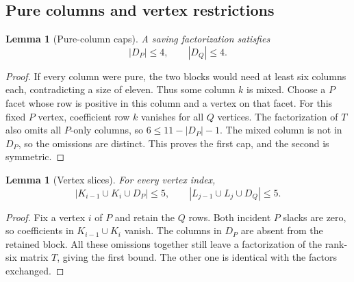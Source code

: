 \documentclass[11pt,a4paper]{article}
\newtheorem{lemma}[theorem]{Lemma}
\theoremstyle{definition}\newtheorem{definition}[theorem]{Definition}
\theoremstyle{remark}\newtheorem{remark}[theorem]{Remark}
\begin{document}
\subsection{Pure columns and vertex restrictions}
\begin{lemma}[Pure-column caps]\label{lem:pure}
A saving factorization satisfies
\begin{equation}\label{eq:pure}
 |D_P|\le4,\qquad |D_Q|\le4.
\end{equation}
\end{lemma}
\begin{proof}
If every column were pure, the two blocks would need at least six columns
each, contradicting a size of eleven. Thus some column $k$ is mixed. Choose
a $P$ facet whose row is positive in this column and a vertex on that facet.
For this fixed $P$ vertex, coefficient row $k$ vanishes for all $Q$ vertices.
The factorization of $T$ also omits all $P$-only columns, so
$6\le11-|D_P|-1$. The mixed column is not in $D_P$, so the omissions are
distinct. This proves the first cap, and the second is symmetric.
\end{proof}

\begin{lemma}[Vertex slices]\label{lem:vertex}
For every vertex index,
\begin{equation}\label{eq:vertex}
 |K_{i-1}\cup K_i\cup D_P|\le5,
 \qquad
 |L_{j-1}\cup L_j\cup D_Q|\le5.
\end{equation}
\end{lemma}
\begin{proof}
Fix a vertex $i$ of $P$ and retain the $Q$ rows. Both incident $P$ slacks are
zero, so coefficients in $K_{i-1}\cup K_i$ vanish. The columns in $D_P$ are
absent from the retained block. All these omissions together still leave a
factorization of the rank-six matrix $T$, giving the first bound. The other
one is identical with the factors exchanged.
\end{proof}
\end{document}
